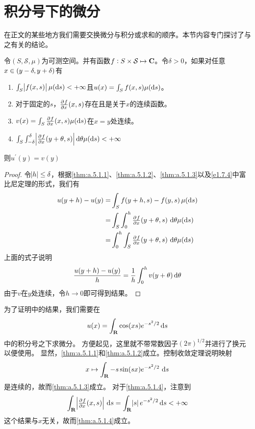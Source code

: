 \documentclass[main.tex]{subfiles}
\begin{document}
\section{积分号下的微分} \label{sec:a.5}
在正文的某些地方我们需要交换微分与积分或求和的顺序。本节内容专门探讨了与之有关的结论。
\begin{theorem} \label{thm:a.5.1}
	令\((S, \mathcal{S}, \mu)\)为可测空间。并有函数\(f: S\times\mathcal{S}\mapsto \mathbf{C}\)。令\(\delta > 0\)，如果对任意\(x \in \intoo{y-\delta, y+\delta}\)有
	\begin{enumerate}
		\item\label{thm:a.5.1.1} \(\int_S\envert{f(x,s)} \mu(\dif s) < +\infty\)且\(u(x) = \int_S f(x,s) \mu(\dif s)\)。
		\item\label{thm:a.5.1.2} 对于固定的\(s\)，\(\pd{f}{x}(x,s)\)存在且是关于\(x\)的连续函数。
		\item\label{thm:a.5.1.3} \(v(x) = \int_S \pd{f}{x}(x,s) \mu(\dif s)\)在\(x=y\)处连续。
		\item\label{thm:a.5.1.4} \(\int_S\int_{-\delta}^{\delta}\envert{\pd{f}{x}(y+\theta, s)} \dif \theta \mu(\dif s) < +\infty\)
	\end{enumerate}
	则\(u^\prime(y) = v(y)\)
\end{theorem}
\begin{proof}
	令\(\envert{h} \leq \delta\)，根据\ref{thm:a.5.1.1}、\ref{thm:a.5.1.2}、\ref{thm:a.5.1.3}以及\ref{e1.7.4}中富比尼定理的形式，我们有
	\[\begin{split}
		u(y+h)-u(y)=&\int_S f(y+h, s)-f(y, s)\,\mu(\dif s)\\
		=&\int_S\int_0^h \pd{f}{x}(y+\theta, s)\,\dif \theta\mu(\dif s)\\
		=&\int_0^h\int_S \pd{f}{x}(y+\theta, s)\,\dif \theta\mu(\dif s)
	\end{split}\]
	上面的式子说明
	\[\frac{u(y+h)-u(y)}{h} = \frac{1}{h}\int_0^h v(y+\theta) \dif \theta\]
	由于\(v\)在\(y\)处连续，令\(h\rightarrow 0\)即可得到结果。
\end{proof}

\begin{example}
	为了证明中的结果，我们需要在
	\[u(x) = \int_\R \cos(xs)e^{-s^2/2} \dif s\]
	中的积分号之下求微分。
	方便起见，这里就不带常数因子\((2\pi)^{1/2}\)并进行了换元以便使用。
	显然，\ref{thm:a.5.1.1}和\ref{thm:a.5.1.2}成立。控制收敛定理说明映射
	\[x\mapsto \int_\R -s\sin(sx)e^{-s^2/2}\,\dif s\]
	是连续的，故而\ref{thm:a.5.1.3}成立。
	对于\ref{thm:a.5.1.4}，注意到
	\[\int_\R \envert{\pd{f}{x}(x, s)}\,\dif s = \int_\R\envert{s}e^{-s^2/2} \dif s < +\infty\]
	这个结果与\(x\)无关，故而\ref{thm:a.5.1.4}成立。
\end{example}
\end{document}
